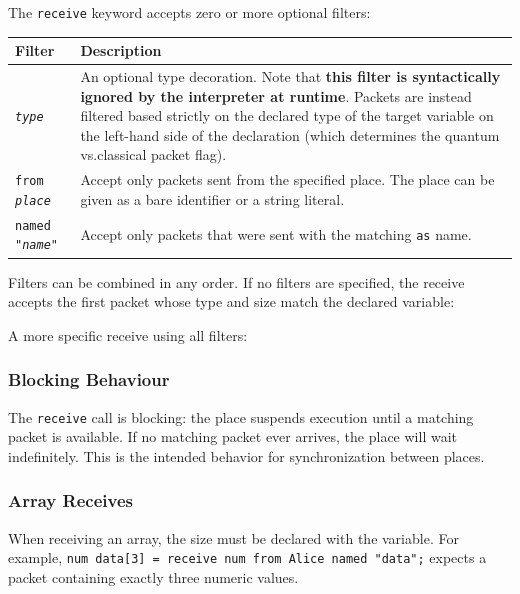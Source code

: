 The \texttt{receive} keyword accepts zero or more optional filters:

\begin{center}
\begin{tabular}{|l|p{9cm}|}
\hline
\textbf{Filter} & \textbf{Description} \\
\hline
\texttt{\textit{type}} &
    An optional type decoration. Note that \textbf{this filter is syntactically ignored by the interpreter at runtime}. Packets are instead filtered based strictly on the declared type of the target variable on the left-hand side of the declaration (which determines the quantum vs.\@ classical packet flag). \\
\hline
\texttt{from \textit{place}} &
    Accept only packets sent from the specified place. The place can be
    given as a bare identifier or a string literal. \\
\hline
\texttt{named "\textit{name}"} &
    Accept only packets that were sent with the matching \texttt{as} name. \\
\hline
\end{tabular}
\end{center}

Filters can be combined in any order. If no filters are specified, the receive
accepts the first packet whose type and size match the declared variable:



A more specific receive using all filters:



\subsubsection{Blocking Behaviour}

The \texttt{receive} call is blocking: the place suspends execution
until a matching packet is available. If no matching packet ever arrives, the
place will wait indefinitely. This is the intended behavior for synchronization
between places.

\subsubsection{Array Receives}

When receiving an array, the size must be declared with the variable.
For example, \texttt{num data[3] = receive num from Alice named "data";}
expects a packet containing exactly three numeric values.

